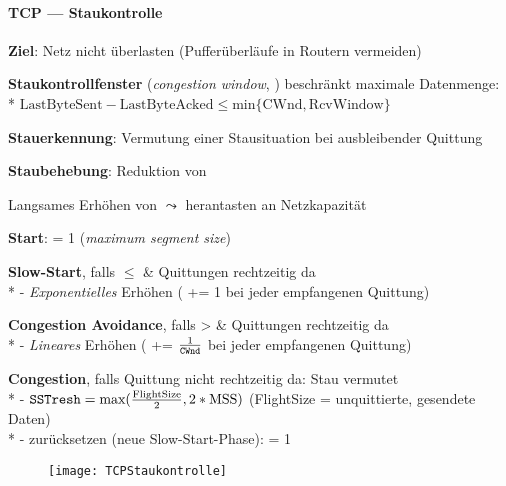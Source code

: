 \paragraph{TCP --- Staukontrolle}
\begin{items}
	  \item \textbf{Ziel}: Netz nicht überlasten (Pufferüberläufe in Routern vermeiden)
	\item \textbf{Staukontrollfenster} (\emph{congestion window}, ) beschränkt maximale Datenmenge: \\*  \( \text{LastByteSent} - \text{LastByteAcked} \leq \text{min} \{ \text{CWnd}, \text{RcvWindow} \} \)
	\item \textbf{Stauerkennung}: Vermutung einer Stausituation bei ausbleibender Quittung
	\item \textbf{Staubehebung}: Reduktion von 
	\item Langsames Erhöhen von  \( \leadsto \) herantasten an Netzkapazität
	\medskip
  \item \textbf{Start}:  = 1  (\emph{maximum segment size})
  \item \textbf{Slow-Start}, falls  \( \leq \)  \& Quittungen rechtzeitig da \\*
    - \emph{Exponentielles} Erhöhen  ( += 1 bei jeder empfangenen Quittung)
  \item \textbf{Congestion Avoidance}, falls  >  \& Quittungen rechtzeitig da \\*
    - \emph{Lineares} Erhöhen  ( += \( \tfrac{1}{\text{\code{CWnd}}} \) bei jeder empfangenen Quittung)
  \item \textbf{Congestion}, falls Quittung nicht rechtzeitig da: Stau vermutet \\*
    - \( \text{\code{SSTresh}} = \text{max}(\tfrac{\text{FlightSize}}{2}, 2*\text{MSS}) \) (FlightSize = unquittierte, gesendete Daten) \\*
    -  zurücksetzen (neue Slow-Start-Phase):  = 1 
\end{items}
\begin{figure}[H]\centering\label{TCPStaukontrolle}\texttt{[image: TCPStaukontrolle]}\end{figure}